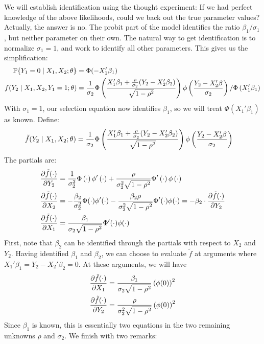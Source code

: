 \documentclass[10pt]{article}
\begin{document}
\begin{example}
	We will establish identification using the thought experiment: If we had perfect knowledge of the above likelihoods, could we back out the true parameter values? Actually, the answer is no. The probit part of the model identifies the ratio $\beta_1 / \sigma_1$, but neither parameter on their own. The natural way to get identification is to normalize $\sigma_1 = 1$, and work to identify all other parameters. This gives us the simplification:
	\begin{align*}
		\mathbb{P}\{Y_1 = 0 \mid X_1,X_2;\theta\} &= \Phi (-X_1'\beta_1) \\f(Y_2 \mid X_1,X_2,Y_1=1;\theta) &=\frac{1}{\sigma_2} \Phi \left( \frac{X_1'\beta_1 +  \frac{\rho}{\sigma_2} (Y_2 - X_2'\beta_2)}{ \sqrt{1-\rho^2}}\right) \phi \left( \frac{Y_2 - X_2'\beta}{\sigma_2}\right) / \Phi \left( X_1'\beta_1\right)
	\end{align*}
	With $\sigma_1 = 1$, our selection equation now identifies $\beta_1$, so we will treat $\Phi(X_1'\beta_1)$ as known. Define:
	\begin{align*}
		\tilde{f}(Y_2 \mid X_1,X_2;\theta) &= \frac{1}{\sigma_2} \Phi \left( \frac{X_1'\beta_1 +  \frac{\rho}{\sigma_2} (Y_2 - X_2'\beta_2)}{ \sqrt{1-\rho^2}}\right) \phi \left( \frac{Y_2 - X_2'\beta}{\sigma_2}\right) 
	\end{align*}
	The partials are:
	\begin{align*}
		\frac{\partial \tilde{f}(\cdot)}{\partial Y_2} &= \frac{1}{\sigma_2^2} \Phi \left( \cdot\right) \phi' \left( \cdot\right) + \frac{\rho}{\sigma_2^2 \sqrt{1-\rho^2}} \Phi'\left( \cdot\right) \phi \left( \cdot\right) \\
		\frac{\partial \tilde{f}(\cdot)}{\partial X_2} &= - \frac{\beta_2}{\sigma_2^2} \Phi(\cdot)\phi'(\cdot) - \frac{\beta_2 \rho }{\sigma_2^2 \sqrt{1-\rho^2}}\Phi'(\cdot)\phi(\cdot)  = -\beta_2 \cdot \frac{\partial \tilde{f}(\cdot)}{\partial Y_2} \\
		\frac{\partial \tilde{f}(\cdot)}{\partial X_1} &= \frac{\beta_1}{\sigma_2\sqrt{1-\rho^2}} \Phi'(\cdot)\phi(\cdot)
	\end{align*}
	First, note that $\beta_2$ can be identified through the partials with respect to $X_2$ and $Y_2$. Having identified $\beta_1$ and $\beta_2$, we can choose to evaluate $\tilde{f}$ at arguments where $X_1'\beta_1 = Y_2 - X_2'\beta_2 = 0$. At these arguments, we will have 
	\begin{align*}
		\frac{\partial \tilde{f}(\cdot)}{\partial X_1} &= \frac{\beta_1}{\sigma_2\sqrt{1-\rho^2}}\left( \phi(0)\right)^2 \\
		\frac{\partial \tilde{f}(\cdot)}{\partial Y_2} &=  \frac{\rho}{\sigma_2^2 \sqrt{1-\rho^2}}\left( \phi(0)\right)^2 
	\end{align*}
	Since $\beta_1$ is known, this is essentially two equations in the two remaining unknowns $\rho$ and $\sigma_2$. We finish with two remarks:
	

\end{example}
\end{document}
